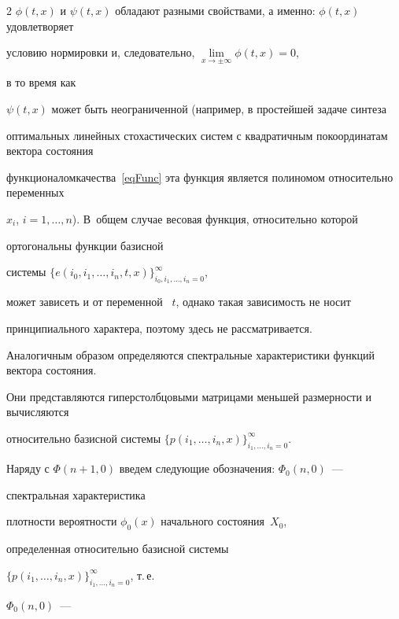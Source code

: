 \begin{multicols}{2}
$\phi(t,x)$ и $\psi(t,x)$ обладают разными свойствами, а именно: $\phi(t,x)$ удовлетворяет 


условию нормировки и, следовательно, ${\mathop{\lim}\limits_{x \to \pm \infty} \phi(t,x) = 0}$, 


в то время как\linebreak


$\psi(t,x)$ может быть неограниченной (например, в простейшей задаче синтеза 


оптимальных линейных стохастических систем с квадратичным по\linebreak координатам вектора состояния 


функционалом\linebreak качества~\eqref{eqFunc} эта функция является полиномом относительно переменных 


$x_i$, ${i = 1,\dots,n}$). В~общем случае весовая функция, относительно которой 


ортогональны функции базисной 


сис\-те\-мы ${\{e(i_0,i_1,\dots,i_n,t,x)\}_{i_0,i_1,\dots,i_n = 0}^\infty}$, 


может зависеть и от переменной~ $t$, однако такая зависимость не носит 


принципиального характера, поэтому здесь не рассматривается.





Аналогичным образом определяются спект\-раль\-ные характеристики функций вектора со\-сто\-яния. 


Они представляются гиперстолбцовыми мат\-ри\-ца\-ми меньшей размерности и вычисляются 


относительно базисной сис\-те\-мы $\{p(i_1,\dots,i_n,x)\}_{i_1,\dots,i_n = 0}^\infty$.





Наряду с ${\Phi(n+1,0)}$ введем следующие обозначения: ${\Phi_0(n,0)}$~--- 


спектральная характеристика\linebreak


плотности вероятности ${\phi_0(x)}$ начального состояния~$X_0$, 


определенная относительно базисной сис\-те\-мы 


$\{p(i_1,\dots,i_n,x)\}_{i_1,\dots,i_n = 0}^\infty$, т.\,е.\ 


${\Phi_0(n,0)}$~---\linebreak



\end{multicols}

